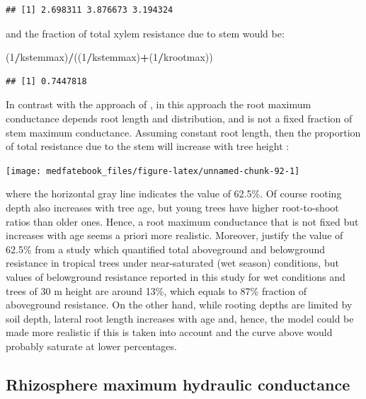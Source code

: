 \documentclass[]{book}
\newenvironment{Shaded}{\begin{snugshade}}{\end{snugshade}}
\newcommand{\DecValTok}[1]{\textcolor[rgb]{0.00,0.00,0.81}{#1}}
\newcommand{\OperatorTok}[1]{\textcolor[rgb]{0.81,0.36,0.00}{\textbf{#1}}}
\newcommand{\NormalTok}[1]{#1}
\begin{document}
\begin{verbatim}
## [1] 2.698311 3.876673 3.194324
\end{verbatim}

and the fraction of total xylem resistance due to stem would be:

\begin{Shaded}
\begin{Highlighting}[]
\NormalTok{(}\DecValTok{1}\OperatorTok{/}\NormalTok{kstemmax)}\OperatorTok{/}\NormalTok{((}\DecValTok{1}\OperatorTok{/}\NormalTok{kstemmax)}\OperatorTok{+}\NormalTok{(}\DecValTok{1}\OperatorTok{/}\NormalTok{krootmax))}
\end{Highlighting}
\end{Shaded}

\begin{verbatim}
## [1] 0.7447818
\end{verbatim}

In contrast with the approach of \citet{Christoffersen2016}, in this
approach the root maximum conductance depends root length and
distribution, and is not a fixed fraction of stem maximum conductance.
Assuming constant root length, then the proportion of total resistance
due to the stem will increase with tree height \citep{Magnani2000}:

\begin{center}\texttt{[image: medfatebook\_files/figure-latex/unnamed-chunk-92-1]} \end{center}

where the horizontal gray line indicates the value of 62.5\%. Of course
rooting depth also increases with tree age, but young trees have higher
root-to-shoot ratios than older ones. Hence, a root maximum conductance
that is not fixed but increases with age seems a priori more realistic.
Moreover, \citet{Christoffersen2016} justify the value of 62.5\% from a
study which quantified total aboveground and belowground resistance in
tropical trees \citep{Fisher2006} under near-saturated (wet season)
conditions, but values of belowground resistance reported in this study
for wet conditions and trees of 30 m height are around 13\%, which
equals to 87\% fraction of aboveground resistance. On the other hand,
while rooting depths are limited by soil depth, lateral root length
increases with age and, hence, the model could be made more realistic if
this is taken into account and the curve above would probably saturate
at lower percentages.

\subsection{Rhizosphere maximum hydraulic
conductance}\label{rhizosphere-maximum-hydraulic-conductance}
\end{document}
